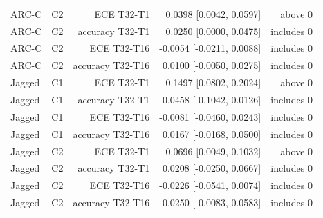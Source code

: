 \begin{table}[h!]
\begin{tabular}{llrrr}
ARC-C & C2 & ECE T32-T1 & 0.0398 [0.0042, 0.0597] & above 0 \\
ARC-C & C2 & accuracy T32-T1 & 0.0250 [0.0000, 0.0475] & includes 0 \\
ARC-C & C2 & ECE T32-T16 & -0.0054 [-0.0211, 0.0088] & includes 0 \\
ARC-C & C2 & accuracy T32-T16 & 0.0100 [-0.0050, 0.0275] & includes 0 \\
Jagged & C1 & ECE T32-T1 & 0.1497 [0.0802, 0.2024] & above 0 \\
Jagged & C1 & accuracy T32-T1 & -0.0458 [-0.1042, 0.0126] & includes 0 \\
Jagged & C1 & ECE T32-T16 & -0.0081 [-0.0460, 0.0243] & includes 0 \\
Jagged & C1 & accuracy T32-T16 & 0.0167 [-0.0168, 0.0500] & includes 0 \\
Jagged & C2 & ECE T32-T1 & 0.0696 [0.0049, 0.1032] & above 0 \\
Jagged & C2 & accuracy T32-T1 & 0.0208 [-0.0250, 0.0667] & includes 0 \\
Jagged & C2 & ECE T32-T16 & -0.0226 [-0.0541, 0.0074] & includes 0 \\
Jagged & C2 & accuracy T32-T16 & 0.0250 [-0.0083, 0.0583] & includes 0 \\
\bottomrule
\end{tabular}
\end{table}
